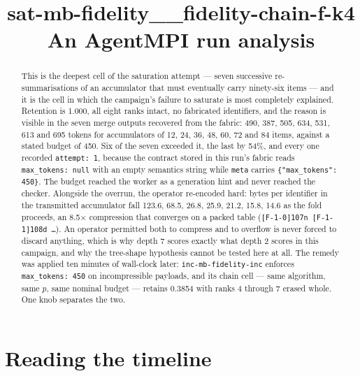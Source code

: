 \documentclass[11pt]{article}
\title{\textbf{sat-mb-fidelity\_\_fidelity-chain-f-k4}\\[2pt]\large An AgentMPI run analysis}
\author{}
\date{}
\begin{document}
\maketitle

\begin{abstract}
This is the deepest cell of the saturation attempt --- seven successive re-summarisations
of an accumulator that must eventually carry ninety-six items --- and it is the cell in
which the campaign's failure to saturate is most completely explained. Retention is 1.000,
all eight ranks intact, no fabricated identifiers, and the reason is visible in the seven
merge outputs recovered from the fabric: 490, 387, 505, 634, 531, 613 and 695 tokens for
accumulators of 12, 24, 36, 48, 60, 72 and 84 items, against a stated budget of 450. Six of
the seven exceeded it, the last by 54\%, and every one recorded \texttt{attempt: 1}, because
the contract stored in this run's fabric reads \texttt{max\_tokens: null} with an empty
semantics string while \texttt{meta} carries \texttt{\{"max\_tokens": 450\}}. The budget
reached the worker as a generation hint and never reached the checker. Alongside the
overrun, the operator re-encoded hard: bytes per identifier in the transmitted accumulator
fall 123.6, 68.5, 26.8, 25.9, 21.2, 15.8, 14.6 as the fold proceeds, an 8.5$\times$
compression that converges on a packed table (\texttt{[F-1-0]107n [F-1-1]108d \dots}). An
operator permitted both to compress and to overflow is never forced to discard anything,
which is why depth 7 scores exactly what depth 2 scores in this campaign, and why the
tree-shape hypothesis cannot be tested here at all. The remedy was applied ten minutes of
wall-clock later: \texttt{inc-mb-fidelity-inc} enforces \texttt{max\_tokens: 450} on
incompressible payloads, and its chain cell --- same algorithm, same $p$, same nominal
budget --- retains 0.3854 with ranks 4 through 7 erased whole. One knob separates the two.
\end{abstract}



\section{Reading the timeline}
\end{document}
